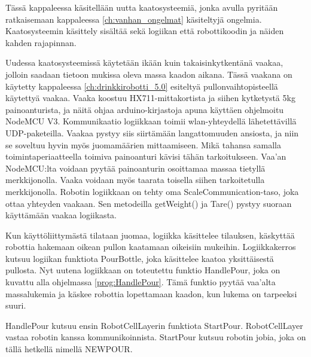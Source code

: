 Tässä kappaleessa käsitellään uutta kaatosysteemiä, jonka avulla pyritään ratkaisemaan kappaleessa \ref{ch:vanhan_ongelmat} käsiteltyjä ongelmia. Kaatosysteemin käsittely sisältää sekä logiikan että robottikoodin ja näiden kahden rajapinnan.

Uudessa kaatosysteemissä käytetään ikään kuin takaisinkytkentänä vaakaa, jolloin saadaan tietoon mukissa oleva massa kaadon aikana. Tässä vaakana on käytetty kappaleessa \ref{ch:drinkkirobotti_5.0} esiteltyä pullonvaihtopisteellä käytettyä vaakaa. Vaaka koostuu HX711-mittakortista ja siihen kytketystä 5kg painoanturista, ja näitä ohjaa arduino-kirjastoja apuna käyttäen ohjelmoitu NodeMCU V3. Kommunikaatio logiikkaan toimii wlan-yhteydellä lähetettävillä UDP-paketeilla. Vaakaa pystyy siis siirtämään langattomuuden ansiosta, ja niin se soveltuu hyvin myös juomamäärien mittaamiseen. Mikä tahansa samalla toimintaperiaatteella toimiva painoanturi kävisi tähän tarkoitukseen. Vaa'an NodeMCU:lta voidaan pyytää painoanturin osoittamaa massaa tietyllä merkkijonolla. Vaaka voidaan myös taarata toisella siihen tarkoitetulla merkkijonolla. Robotin logiikkaan on tehty oma ScaleCommunication-taso, joka ottaa yhteyden vaakaan. Sen metodeilla getWeight() ja Tare() pystyy suoraan käyttämään vaakaa logiikasta.


Kun käyttöliittymästä tilataan juomaa, logiikka käsittelee tilauksen, käskyttää robottia hakemaan oikean pullon kaatamaan oikeisiin mukeihin. Logiikkakerros kutsuu logiikan funktiota PourBottle, joka käsittelee kaatoa yksittäisestä pullosta. Nyt uutena logiikkaan on toteutettu funktio HandlePour, joka on kuvattu alla ohjelmassa \ref{prog:HandlePour}. Tämä funktio pyytää vaa'alta massalukemia ja käskee robottia lopettamaan kaadon, kun lukema on tarpeeksi suuri.


\newpage

\lstset{style=sharpc}


HandlePour kutsuu ensin RobotCellLayerin funktiota StartPour. RobotCellLayer vastaa robotin kanssa kommunikoinnista. StartPour kutsuu robotin jobia, joka on tällä hetkellä nimellä NEWPOUR.

